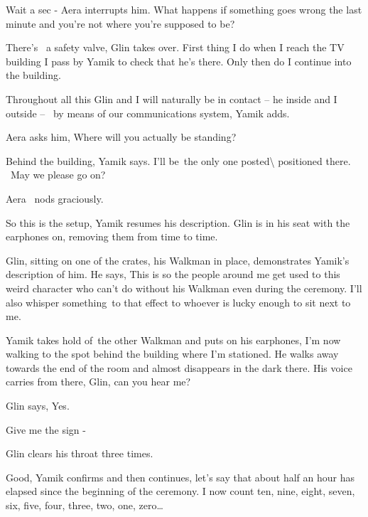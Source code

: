 \documentclass[letterpaper]{article}
\begin{document}
{\textquotedbl}Wait a sec - {\textquotedbl} Aera interrupts him. {\textquotedbl}What happens if something goes wrong the
last minute and you're not where you're supposed to be?{\textquotedbl} 

{\textquotedbl}There's ~a safety valve,{\textquotedbl} Glin takes over. {\textquotedbl}First thing I do when I reach the
TV building I pass by Yamik to check that he's there. Only then do I continue into the building.{\textquotedbl} 

{\textquotedbl}Throughout all this Glin and I will naturally be in contact -- he inside and I outside -- \ by means of
our communications system,{\textquotedbl} Yamik adds.

Aera asks him, {\textquotedbl}Where will you actually be standing?{\textquotedbl} 

{\textquotedbl}Behind the building,{\textquotedbl} Yamik says. {\textquotedbl}I'll be~the only one
posted{\textbackslash} positioned there.\textcolor[rgb]{0.0,0.4392157,0.7529412}{ \ }May we please go
on?{\textbar}{\textquotedbl}

Aera \ nods graciously.

{\textquotedbl}So this is the setup,{\textquotedbl} Yamik resumes his description. {\textquotedbl}Glin is in his seat
with the earphones on, removing them from time to time.{\textquotedbl} 

Glin, sitting on one of the crates, his Walkman in place, demonstrates Yamik's description of him. He says,
{\textquotedbl}This is so the\textcolor[rgb]{0.0,0.4392157,0.7529412}{ }people around me get used to this weird
character who can't do without his Walkman even during the ceremony. I'll also whisper something~to that effect to
whoever is lucky enough to sit next to me.{\textquotedbl} 

Yamik takes hold of~the other Walkman and puts on his earphones, {\textquotedbl}I'm now walking to the spot behind the
building where I'm stationed.{\textquotedbl} He walks away towards the end of the room and almost disappears in the
dark there. His voice carries from there, {\textquotedbl}Glin, can you hear me?{\textquotedbl} 

Glin says, {\textquotedbl}Yes.{\textquotedbl} 

{\textquotedbl}Give me the sign -{\textquotedbl}

Glin clears his throat three times. 

{\textquotedbl}Good,{\textquotedbl} Yamik confirms and then continues, {\textquotedbl}let's say that about half an hour
has elapsed since the beginning of the ceremony. I now count ten, nine, eight, seven, six, five, four, three, two, one,
zero{\dots}{\textquotedbl} 
\end{document}
